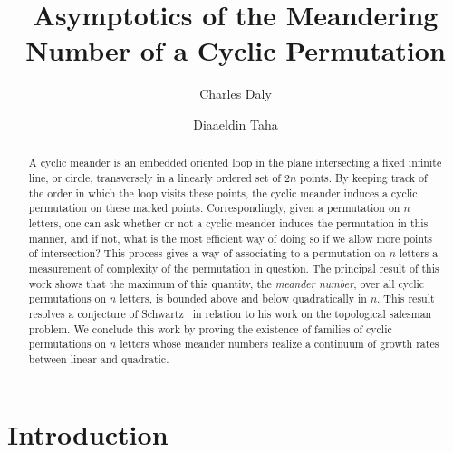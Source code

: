 \documentclass[11pt,a4paper]{amsart}
\title{Asymptotics of the Meandering Number of a Cyclic Permutation}
\date{}
\author[Charles Daly]{Charles Daly}
\author[Diaaeldin Taha]{Diaaeldin Taha}
\theoremstyle{definition}
\theoremstyle{remark}
\begin{document}
\begin{abstract}
A cyclic meander is an embedded oriented loop in the plane intersecting a fixed infinite line, or circle, transversely in a linearly ordered set of $2n$ points.  By keeping track of the order in which the loop visits these points, the cyclic meander induces a cyclic permutation on these marked points.  Correspondingly, given a permutation on $n$ letters, one can ask whether or not a cyclic meander induces the permutation in this manner, and if not, what is the most efficient way of doing so if we allow more points of intersection?  This process gives a way of associating to a permutation on $n$ letters a measurement of complexity of the permutation in question. The principal result of this work shows that the maximum of this quantity, the \emph{meander number}, over all cyclic permutations on $n$ letters, is bounded above and below quadratically in $n$.  This result resolves a conjecture of Schwartz~\cite{richtpss} in relation to his work on the topological salesman problem.  We conclude this work by proving the existence of families of cyclic permutations on $n$ letters whose meander numbers realize a continuum of growth rates between linear and quadratic.
\end{abstract}

\maketitle




\section{Introduction}
\label{sec:introduction}
\end{document}
